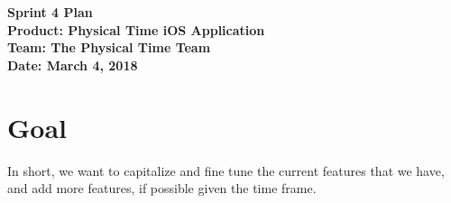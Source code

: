 \documentclass[11pt]{article}
\newcommand\tab[1][1cm]{\hspace*{#1}}
\begin{document}
	\Large{\textbf{Sprint 4 Plan}}\\
	\Large{\textbf{Product: Physical Time iOS Application}}\\
	\Large{\textbf{Team: The Physical Time Team}}\\
	\Large{\textbf{Date: March 4, 2018}}\\

	\vspace{-3mm}

	\section{Goal}
		\vspace{-3mm}
		\tab \normalsize{In short, we want to capitalize and fine tune the current features that we have, and add more features, if possible given the time frame.}
\end{document}
